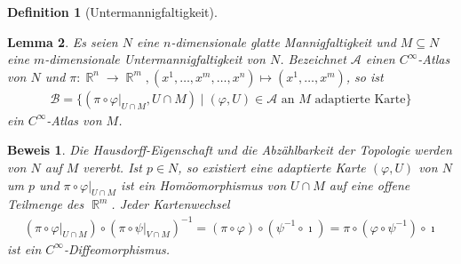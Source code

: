 \documentclass[paper=A4, twoside, chapterprefix=true, bibliography=totoc, headsepline]{scrbook}
\let\temp\phi{}
\let\phi\varphi{}
\let\varphi\temp{}
\let\temp\theta{}
\let\theta\vartheta{}
\let\vartheta\temp{}
\let\temp\epsilon{}
\let\epsilon\varepsilon{}
\let\varepsilon\temp{}
\let\temp\rho{}
\let\rho\varrho{}
\let\varrho\temp{}
\DeclareMathOperator{\R}{\mathbb{R}}
\theoremstyle{plain}
\newtheorem{Dfn}{Definition}[chapter]
\newtheorem{Lemma}[Dfn]{Lemma}
\theoremstyle{nonumberplain}
\newtheorem{bew}{Beweis}
\theoremstyle{empty}
\theoremstyle{break}
\begin{document}
\begin{Dfn}[Untermannigfaltigkeit]
\begin{center}
\end{center}

\end{Dfn}

\begin{Lemma}\label{lemma-1-5}
  Es seien $N$ eine $n$-dimensionale glatte Mannigfaltigkeit und $M \subseteq N$ eine $m$-dimensionale Untermannigfaltigkeit von $N$. Bezeichnet $\mathcal A$ einen $C^{\infty}$-Atlas von $N$ und $\pi \colon \R^n \to \R^m, (x^1, \ldots, x^m,\ldots,x^n) \mapsto (x^1, \ldots, x^m)$, so ist
  \begin{align*}
    \mathcal B = \{(\pi \circ \phi|_{U \cap M},U\cap M) \mid (\phi, U) \in \mathcal A \text{ an } M \text{ adaptierte Karte}\}
  \end{align*}
  ein $C^{\infty}$-Atlas von $M$.
\end{Lemma}

\begin{bew}
Die Hausdorff-Eigenschaft und die Abz\"ahlbarkeit der Topologie werden von $N$ auf $M$ vererbt.
Ist $p \in N$, so existiert eine adaptierte Karte $(\phi,U)$ von $N$ um $p$ und $\pi \circ \phi|_{U \cap M}$ ist ein Hom\"oomorphismus von $U \cap M$ auf eine offene Teilmenge des $\R^m$. Jeder Kartenwechsel
\begin{align*}
	(\pi \circ \phi|_{U \cap M}) \circ (\pi \circ \psi|_{V \cap M})^{-1} = (\pi \circ \phi) \circ (\psi^{-1} \circ \imath) = \pi \circ (\phi \circ \psi^{-1}) \circ \imath
\end{align*}
ist ein $C^{\infty}$-Diffeomorphismus.
\end{bew}
\end{document}
